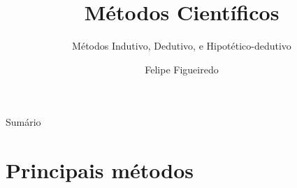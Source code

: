 \documentclass{beamer}
\title%
{Métodos Científicos}
\subtitle
{Métodos Indutivo, Dedutivo, e Hipotético-dedutivo} %
\author%
{Felipe Figueiredo}%
\institute[INTO] %
{Instituto Nacional de Traumatologia e Ortopedia
}
\date%
{}
\begin{document}
\begin{frame}
  \titlepage
\end{frame}

\begin{frame}{Sumário}
  \tableofcontents
\end{frame}








\section{Principais métodos}
\end{document}
